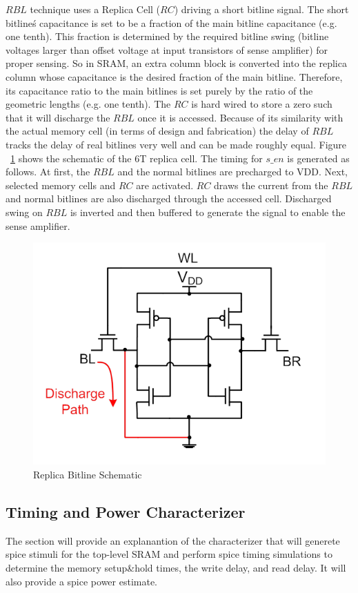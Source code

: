 $RBL$ technique uses a Replica Cell ($RC$) driving a short bitline signal. The short bitline\'s capacitance is set to be a 
fraction of the main bitline capacitance (e.g. one tenth). This fraction is determined by the required bitline swing 
(bitline voltages larger than offset voltage at input transistors of sense amplifier) for proper sensing. So in SRAM, an 
extra column block is converted into the replica column whose capacitance is the desired fraction of the main bitline. 
Therefore, its capacitance ratio to the main bitlines is set purely by the ratio of the geometric lengths (e.g. one tenth). 
The $RC$ is hard wired to store a zero such that it will discharge the $RBL$ once it is accessed. 
Because of its similarity with the actual memory cell (in terms of design and fabrication) the delay of $RBL$ tracks the delay of 
real bitlines very well and can be made roughly equal.  Figure ~\ref{fig:RC} shows the schematic of the 6T replica cell. 
The timing for $s\_en$ is generated as follows. At first, the $RBL$ and the normal bitlines are precharged to VDD. 
Next, selected memory cells and $RC$ are activated.  $RC$ draws the current from the $RBL$ and normal bitlines are 
also discharged through the accessed cell. Discharged swing on $RBL$ is inverted and then buffered to generate the signal to enable the sense amplifier.

	  
\begin{figure}[h!]
\centering
\includegraphics[scale=1]{./figs/replica_cell.pdf}
\caption{Replica Bitline Schematic}
\label{fig:RC}
\end{figure}




\subsection{Timing and Power Characterizer}
\label{characterizer}

The section will provide an explanantion of the characterizer that will generete spice stimuli for the top-level SRAM and perform spice timing simulations to determine the memory setup\&hold times, the write delay, and read delay.  It will also provide a spice power estimate.  

